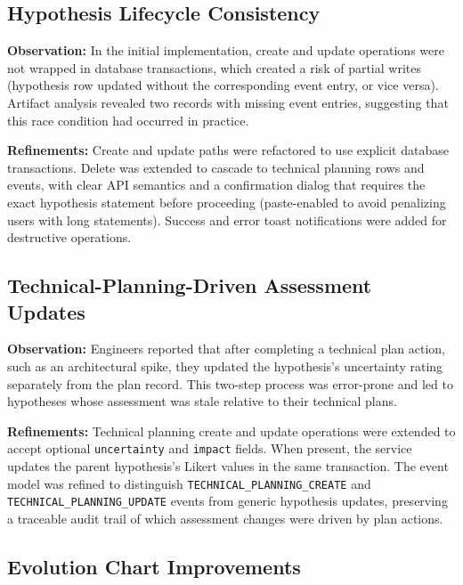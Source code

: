 \subsection{Hypothesis Lifecycle Consistency}
\label{subsec:refinement-lifecycle}

\textbf{Observation:} In the initial implementation, create and update operations
were not wrapped in database transactions, which created a risk of partial writes
(hypothesis row updated without the corresponding event entry, or vice versa).
Artifact analysis revealed two records with missing event entries, suggesting that
this race condition had occurred in practice.

\textbf{Refinements:} Create and update paths were refactored to use explicit
database transactions. Delete was extended to cascade to technical planning rows
and events, with clear API semantics and a confirmation dialog that requires the
exact hypothesis statement before proceeding (paste-enabled to avoid penalizing
users with long statements). Success and error toast notifications were added
for destructive operations.

\subsection{Technical-Planning-Driven Assessment Updates}
\label{subsec:refinement-tp-assessment}

\textbf{Observation:} Engineers reported that after completing a technical plan
action, such as an architectural spike, they updated the hypothesis's uncertainty
rating separately from the plan record. This two-step process was error-prone
and led to hypotheses whose assessment was stale relative to their technical
plans.

\textbf{Refinements:} Technical planning create and update operations were
extended to accept optional \texttt{uncertainty} and \texttt{impact} fields.
When present, the service updates the parent hypothesis's Likert values in the
same transaction. The event model was refined to distinguish
\texttt{TECHNICAL\_PLANNING\_CREATE} and \texttt{TECHNICAL\_PLANNING\_UPDATE}
events from generic hypothesis updates, preserving a traceable audit trail of
which assessment changes were driven by plan actions.

\subsection{Evolution Chart Improvements}
\label{subsec:refinement-chart}

